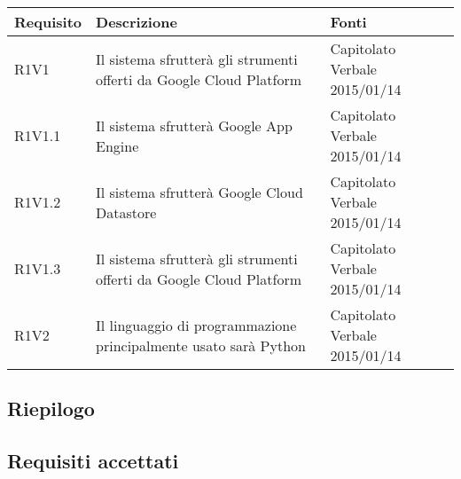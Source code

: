 \begin{center}

	\def\arraystretch{1.5}
	\bgroup
	\begin{longtable}{| p{2cm} | p{8cm} | p{2cm} |}

		\hline
		\textbf{Requisito} & \textbf{Descrizione} & \textbf{Fonti} \\
		\hline

		R1V1  &  Il sistema sfrutterà gli strumenti offerti da Google Cloud Platform  &  Capitolato \newline Verbale 2015/01/14 \\
		\hline
		R1V1.1  &  Il sistema sfrutterà Google App Engine  &  Capitolato \newline Verbale 2015/01/14 \\
		\hline
		R1V1.2  &  Il sistema sfrutterà Google Cloud Datastore  &  Capitolato \newline Verbale 2015/01/14 \\
		\hline
		R1V1.3  &  Il sistema sfrutterà gli strumenti offerti da Google Cloud Platform  &  Capitolato \newline Verbale 2015/01/14 \\
		\hline
		R1V2  &  Il linguaggio di programmazione principalmente usato sarà Python  &  Capitolato \newline Verbale 2015/01/14 \\
		\hline

	\end{longtable}
	\egroup
\end{center}

\subsection{Riepilogo}

\subsection{Requisiti accettati}
